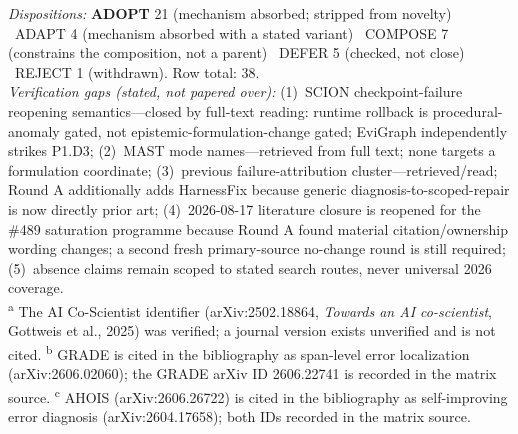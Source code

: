 \par\medskip
\noindent\textit{Dispositions:} \textbf{ADOPT} 21 (mechanism absorbed; stripped from novelty) \textperiodcentered\ ADAPT 4 (mechanism absorbed with a stated variant) \textperiodcentered\ COMPOSE 7 (constrains the composition, not a parent) \textperiodcentered\ DEFER 5 (checked, not close) \textperiodcentered\ REJECT 1 (withdrawn). Row total: 38.\\
\noindent\textit{Verification gaps (stated, not papered over):} (1)~SCION checkpoint-failure reopening semantics---closed by full-text reading: runtime rollback is procedural-anomaly gated, not epistemic-formulation-change gated; EviGraph independently strikes P1.D3; (2)~MAST mode names---retrieved from full text; none targets a formulation coordinate; (3)~previous failure-attribution cluster---retrieved/read; Round A additionally adds HarnessFix because generic diagnosis-to-scoped-repair is now directly prior art; (4)~2026-08-17 literature closure is reopened for the \#489 saturation programme because Round A found material citation/ownership wording changes; a second fresh primary-source no-change round is still required; (5)~absence claims remain scoped to stated search routes, never universal 2026 coverage.\\
\textsuperscript{a} The AI Co-Scientist identifier (arXiv:2502.18864, \textit{Towards an AI co-scientist}, Gottweis et al., 2025) was verified; a journal version exists unverified and is not cited. \textsuperscript{b} GRADE \cite{spanlevel2026} is cited in the bibliography as span-level error localization (arXiv:2606.02060); the GRADE arXiv ID 2606.22741 is recorded in the matrix source. \textsuperscript{c} AHOIS (arXiv:2606.26722) is cited in the bibliography as self-improving error diagnosis (arXiv:2604.17658); both IDs recorded in the matrix source.
